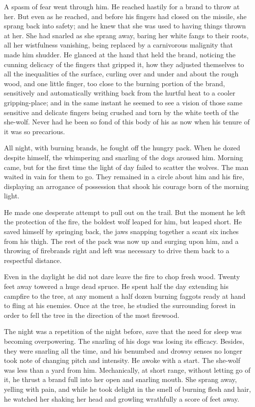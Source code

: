 \documentclass[10pt]{book}
\begin{document}
A spasm of fear went through him. He reached hastily for a brand to
throw at her. But even as he reached, and before his fingers had closed
on the missile, she sprang back into safety; and he knew that she was
used to having things thrown at her. She had snarled as she sprang
away, baring her white fangs to their roots, all her wistfulness
vanishing, being replaced by a carnivorous malignity that made him
shudder. He glanced at the hand that held the brand, noticing the
cunning delicacy of the fingers that gripped it, how they adjusted
themselves to all the inequalities of the surface, curling over and
under and about the rough wood, and one little finger, too close to the
burning portion of the brand, sensitively and automatically writhing
back from the hurtful heat to a cooler gripping-place; and in the same
instant he seemed to see a vision of those same sensitive and delicate
fingers being crushed and torn by the white teeth of the she-wolf.
Never had he been so fond of this body of his as now when his tenure of
it was so precarious.

All night, with burning brands, he fought off the hungry pack. When he
dozed despite himself, the whimpering and snarling of the dogs aroused
him. Morning came, but for the first time the light of day failed to
scatter the wolves. The man waited in vain for them to go. They
remained in a circle about him and his fire, displaying an arrogance of
possession that shook his courage born of the morning light.

He made one desperate attempt to pull out on the trail. But the moment
he left the protection of the fire, the boldest wolf leaped for him,
but leaped short. He saved himself by springing back, the jaws snapping
together a scant six inches from his thigh. The rest of the pack was
now up and surging upon him, and a throwing of firebrands right and
left was necessary to drive them back to a respectful distance.

Even in the daylight he did not dare leave the fire to chop fresh wood.
Twenty feet away towered a huge dead spruce. He spent half the day
extending his campfire to the tree, at any moment a half dozen burning
faggots ready at hand to fling at his enemies. Once at the tree, he
studied the surrounding forest in order to fell the tree in the
direction of the most firewood.

The night was a repetition of the night before, save that the need for
sleep was becoming overpowering. The snarling of his dogs was losing
its efficacy. Besides, they were snarling all the time, and his
benumbed and drowsy senses no longer took note of changing pitch and
intensity. He awoke with a start. The she-wolf was less than a yard
from him. Mechanically, at short range, without letting go of it, he
thrust a brand full into her open and snarling mouth. She sprang away,
yelling with pain, and while he took delight in the smell of burning
flesh and hair, he watched her shaking her head and growling wrathfully
a score of feet away.
\end{document}
